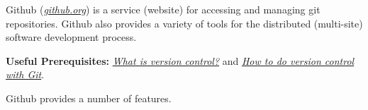\documentclass[]{article}
\date{}
\begin{document}
\pagestyle{fancy}
\renewcommand{\headrulewidth}{0pt}
  
\thispagestyle{empty}
\textbf{\newline}
\textbf{\newline}
\textbf{\newline}

Github (\href{https://github.com/}{\emph{github.org}}) is a service
(website) for accessing and managing git repositories. Github also
provides a variety of tools for the distributed (multi-site) software
development process.

\textbf{Useful Prerequisites:}
\href{https://docs.google.com/document/d/1LHT4e-BjB31BcCSL42xSI5GBNCNpQ-SS5K5iyStH6sw/edit}{\emph{What
is version control?}} and
\href{https://docs.google.com/document/d/1mSrTdzZdLDz-YRquzABNhI87tGd_zP04ctyscmZ_Phw/edit}{\emph{How
to do version control with Git}}.

Github provides a number of features.
\end{document}
